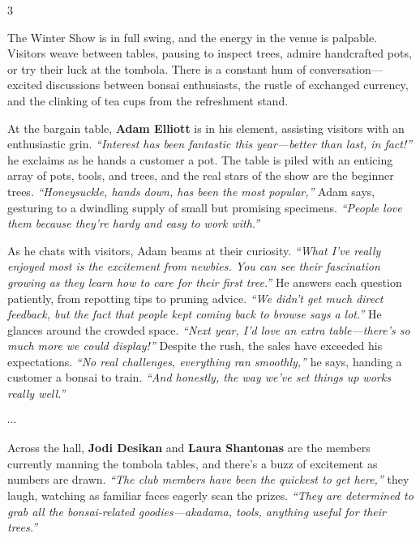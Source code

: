 \begin{multicols}{3}
\medskip
{}

\noindent
The Winter Show is in full swing, and the energy in the venue is palpable. 
Visitors weave between tables, pausing to inspect trees, admire handcrafted pots, or try their luck at the tombola. 
There is a constant hum of conversation---excited discussions between bonsai enthusiasts, the rustle of exchanged currency, and the clinking of tea cups from the refreshment stand.

At the bargain table, \textbf{Adam Elliott} is in his element, assisting visitors with an enthusiastic grin. \textit{``Interest has been fantastic this year---better than last, in fact!''} he exclaims as he hands a customer a pot. 
The table is piled with an enticing array of pots, tools, and trees, and the real stars of the show are the beginner trees. \textit{``Honeysuckle, hands down, has been the most popular,''} Adam says, gesturing to a dwindling supply of small but promising specimens. \textit{``People love them because they're hardy and easy to work with.''}

As he chats with visitors, Adam beams at their curiosity. \textit{``What I've really enjoyed most is the excitement from newbies. You can see their fascination growing as they learn how to care for their first tree.''} He answers each question patiently, from repotting tips to pruning advice. \textit{``We didn't get much direct feedback, but the fact that people kept coming back to browse says a lot.''} He glances around the crowded space. \textit{``Next year, I'd love an extra table---there's so much more we could display!''} Despite the rush, the sales have exceeded his expectations. \textit{``No real challenges, everything ran smoothly,''} he says, handing a customer a bonsai to train. \textit{``And honestly, the way we've set things up works really well.''}

\begin{center}
    $\cdots$
\end{center}

\noindent
Across the hall, \textbf{Jodi Desikan} and \textbf{Laura Shantonas} are the members currently manning the tombola tables, and there's a buzz of excitement as numbers are drawn. \textit{``The club members have been the quickest to get here,''} they laugh, watching as familiar faces eagerly scan the prizes. \textit{``They are determined to grab all the bonsai\--related goodies---akadama, tools, anything useful for their trees.''}


\end{multicols}
